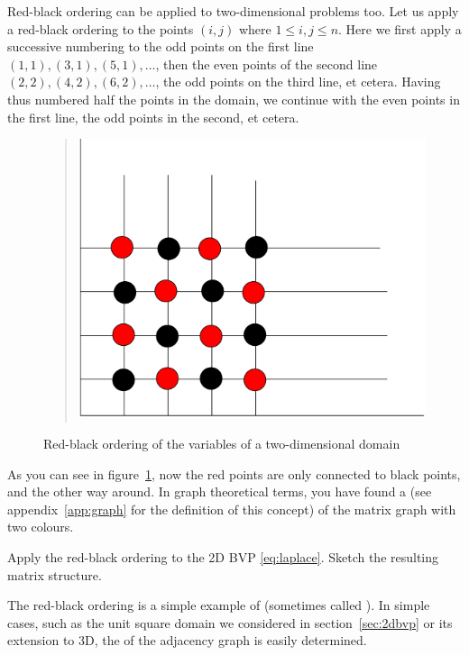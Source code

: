 Red-black ordering can be applied to two-dimensional problems too.
Let us apply a red-black ordering to the points $(i,j)$ where $1\leq
i,j\leq n$.
Here we first apply a successive numbering to the odd
points on the first line $(1,1),(3,1),(5,1),\ldots$, then the even
points of the second line $(2,2),(4,2),(6,2),\ldots$, the odd points
on the third line, et cetera. Having thus numbered half the points in
the domain, we continue with the even points in the first line, the
odd points in the second, et cetera.
\begin{figure}[ht]
  \begin{quote}
    \includegraphics[scale=.12]{graphics/redblack}
  \end{quote}
  \caption{Red-black ordering of the variables of a two-dimensional
    domain}
  \label{fig:redblack}
\end{figure}
As you can see in figure~\ref{fig:redblack}, now the red points are
only connected to black points, and the other way around. In graph
theoretical terms, you have found a  
(see appendix~\ref{app:graph} for the definition
of this concept) of the matrix graph with two colours.

\begin{exercise}
  Apply the red-black ordering to the 2D \ac{BVP} \eqref{eq:laplace}.
  Sketch the resulting matrix structure.
\end{exercise}

The red-black ordering is a simple
example of  (sometimes called
). In
simple cases, such as the unit square domain we considered in
section~\ref{sec:2dbvp} or its extension to 3D, the  of the adjacency graph is easily determined.

